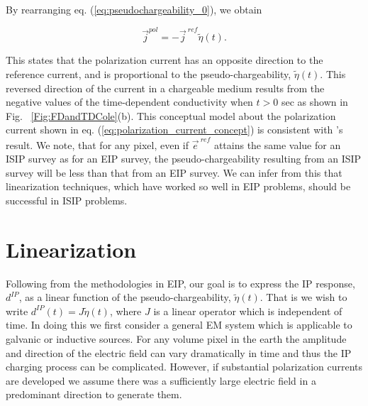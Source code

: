 \documentclass[extra,mreferee]{gji}
\renewcommand {\j}  { {\vec j} }
\newcommand {\e}  { {\vec e} }
\newcommand{\peta}{\tilde{\eta}}
\newcommand{\eref}{\e^{\ ref}}
\newcommand{\jref}{\j^{\ ref}}
\newcommand{\dip}{d^{IP}}
\begin{document}
By rearranging eq. (\ref{eq:pseudochargeability_0}), we obtain 
\begin{linenomath*}
\begin{equation}
  \j^{pol} = -\jref\peta(t). 
  \label{eq:polarization_current_concept}
\end{equation}
\end{linenomath*}
This states that the polarization current has an opposite direction to the reference current, and is proportional to the pseudo-chargeability, $\peta(t)$.
This reversed direction of the current in a chargeable medium results from the negative values of the time-dependent conductivity when $t>$0 sec as shown in Fig. ~\ref{Fig:FDandTDCole}(b). 
This conceptual model about the polarization current shown in eq. (\ref{eq:polarization_current_concept}) is consistent with \cite{seigel1959}'s result. We note, that for any pixel, even if  $\eref$  attains the same value for an ISIP survey as for an EIP survey, the pseudo-chargeability resulting from an ISIP survey will be less than that from an EIP survey. We can infer from this that linearization techniques, which have worked so well in EIP problems, should be successful in ISIP problems. 

\section{Linearization}
Following from the methodologies in EIP, our goal is to express the IP response, $\dip$, as a linear function of the pseudo-chargeability,  $\peta(t)$. That is we wish to write  $\dip(t) = J\peta(t)$, where $J$ is a linear operator which is independent of time. In doing this we first consider a general EM system which is applicable to galvanic or inductive sources. 
For any volume pixel in the earth the amplitude and direction of the  electric field can vary dramatically in time and thus the IP charging process can be complicated. However, if substantial polarization currents are developed we assume there was a sufficiently large electric field in a predominant direction to generate them. 
\end{document}
